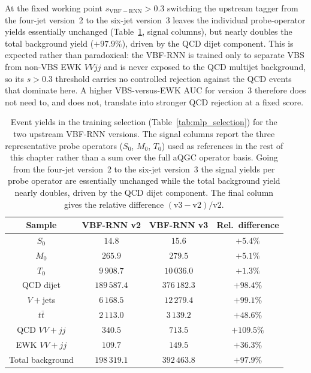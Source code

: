 At the fixed working point $s_{\mathrm{VBF-RNN}}>0.3$ switching the upstream tagger from the four-jet version~2 to the six-jet version~3 leaves the individual probe-operator yields essentially unchanged (Table~\ref{tab:mlp_yields}, signal columns), but nearly doubles the total background yield ($+97.9\%$), driven by the QCD dijet component. This is expected rather than paradoxical: the VBF-RNN is trained only to separate VBS from non-VBS EWK $VVjj$ and is never exposed to the QCD multijet background, so its $s>0.3$ threshold carries no controlled rejection against the QCD events that dominate here. A higher VBS-versus-EWK AUC for version~3 therefore does not need to, and does not, translate into stronger QCD rejection at a fixed score.

\begin{table}[htbp]
  \centering
  \caption{Event yields in the training selection (Table~\ref{tab:mlp_selection}) for the two upstream VBF-RNN versions. The signal columns report the three representative probe operators ($S_0$, $M_0$, $T_0$) used as references in the rest of this chapter rather than a sum over the full aQGC operator basis. Going from the four-jet version~2 to the six-jet version~3 the signal yields per probe operator are essentially unchanged while the total background yield nearly doubles, driven by the QCD dijet component. The final column gives the relative difference $(\mathrm{v3}-\mathrm{v2})/\mathrm{v2}$.}
  \label{tab:mlp_yields}
  \begin{tabular}{|c|c|c|c|}
    \hline
    \textbf{Sample} & \textbf{VBF-RNN v2} & \textbf{VBF-RNN v3} & \textbf{Rel.\ difference} \\
    \hline
    $S_0$ & $14.8$    & $15.6$ & $+5.4\%$ \\
    $M_0$ & $265.9$   & $279.5$ & $+5.1\%$ \\
    $T_0$ & $9\,908.7$ & $10\,036.0$ & $+1.3\%$ \\
    \hline
    QCD dijet         & $189\,587.4$ & $376\,182.3$ & $+98.4\%$ \\
    $V+$jets          & $6\,168.5$   & $12\,279.4$ & $+99.1\%$ \\
    $t\bar{t}$        & $2\,113.0$   & $3\,139.2$ & $+48.6\%$ \\
    QCD $VV+jj$& $340.5$      & $713.5$ & $+109.5\%$ \\
    EWK $VV+jj$        & $109.7$      & $149.5$ & $+36.3\%$ \\
    \hline
    Total background  & $198\,319.1$ & $392\,463.8$ & $+97.9\%$ \\
    \hline
  \end{tabular}
\end{table}

